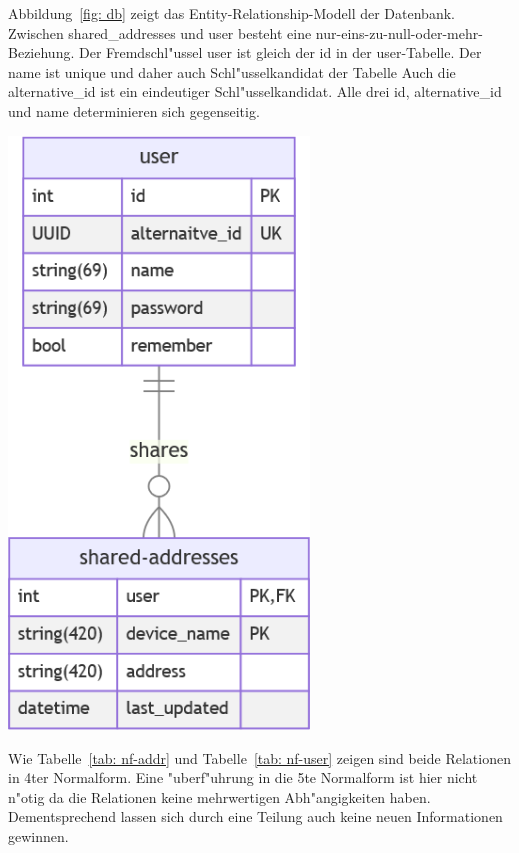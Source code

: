 \begin{minipage}{0.425\textwidth}
    Abbildung~\ref{fig: db} zeigt das Entity-Relationship-Modell der Datenbank.
    Zwischen shared\_addresses und user besteht eine nur-eins-zu-null-oder-mehr-Beziehung.
    Der Fremdschl{"u}ssel user ist gleich der id in der user-Tabelle.
    Der name ist unique und daher auch Schl{"u}sselkandidat der Tabelle
    Auch die alternative\_id ist ein eindeutiger Schl{"u}sselkandidat.
    Alle drei id, alternative\_id und name determinieren sich gegenseitig.
\end{minipage}
\hspace{0.05\textwidth}
\begin{minipage}{0.425\textwidth}
    \centering
    \includegraphics[width=0.6\textwidth]{db}
    \label{fig: db}
\end{minipage}

\vspace{2cm}



Wie Tabelle~\ref{tab: nf-addr} und Tabelle~\ref{tab: nf-user} zeigen sind beide Relationen in 4ter Normalform.
Eine {"u}berf{"u}hrung in die 5te Normalform ist hier nicht n{"o}tig da die Relationen keine mehrwertigen Abh{"a}ngigkeiten haben.
Dementsprechend lassen sich durch eine Teilung auch keine neuen Informationen gewinnen.

